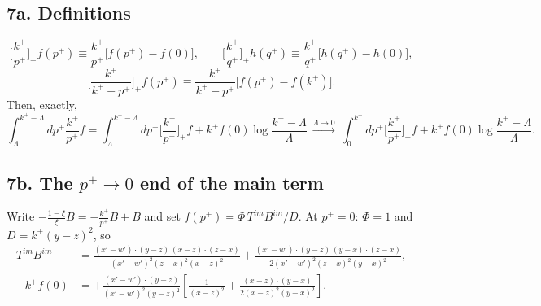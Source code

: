 \documentclass[10pt]{article}
\numberwithin{equation}{section}
\begin{document}
\subsection*{7a. Definitions}
\[
\Big[\frac{k^{+}}{p^{+}}\Big]_{+}f(p^{+})\equiv\frac{k^{+}}{p^{+}}\big[f(p^{+})-f(0)\big],\qquad
\Big[\frac{k^{+}}{q^{+}}\Big]_{+}h(q^{+})\equiv\frac{k^{+}}{q^{+}}\big[h(q^{+})-h(0)\big],\]\[
\Big[\frac{k^{+}}{k^{+}-p^{+}}\Big]_{+}f(p^{+})\equiv\frac{k^{+}}{k^{+}-p^{+}}\big[f(p^{+})-f(k^{+})\big].
\]
Then, exactly,
\begin{equation}
\int_{\Lambda}^{k^{+}-\Lambda}dp^{+}\frac{k^{+}}{p^{+}}f=\int_{\Lambda}^{k^{+}-\Lambda}dp^{+}\Big[\frac{k^{+}}{p^{+}}\Big]_{+}f+k^{+}f(0)\log\frac{k^{+}-\Lambda}{\Lambda}
\ \xrightarrow{\Lambda\to0}\ \int_{0}^{k^{+}}dp^{+}\Big[\frac{k^{+}}{p^{+}}\Big]_{+}f+k^{+}f(0)\log\frac{k^{+}-\Lambda}{\Lambda}.
\end{equation}

\subsection*{7b. The $p^{+}\to0$ end of the main term}
Write $-\frac{1-\xi}{\xi}B=-\frac{k^{+}}{p^{+}}B+B$ and set $f(p^{+})=\Phi\,T^{im}B^{im}/D$. At $p^{+}=0$: $\Phi=1$ and $D=k^{+}(y-z)^{2}$, so
\begin{align}
T^{im}B^{im}&=\frac{(x'-w')\cdot(y-z)\,(x-z)\cdot(z-x)}{(x'-w')^{2}(z-x)^{2}(x-z)^{2}}+\frac{(x'-w')\cdot(y-z)\,(y-x)\cdot(z-x)}{2(x'-w')^{2}(z-x)^{2}(y-x)^{2}},\\
-k^{+}f(0)&=+\frac{(x'-w')\cdot(y-z)}{(x'-w')^{2}(y-z)^{2}}\left[\frac{1}{(x-z)^{2}}+\frac{(x-z)\cdot(y-x)}{2(x-z)^{2}(y-x)^{2}}\right].
\end{align}
\end{document}
